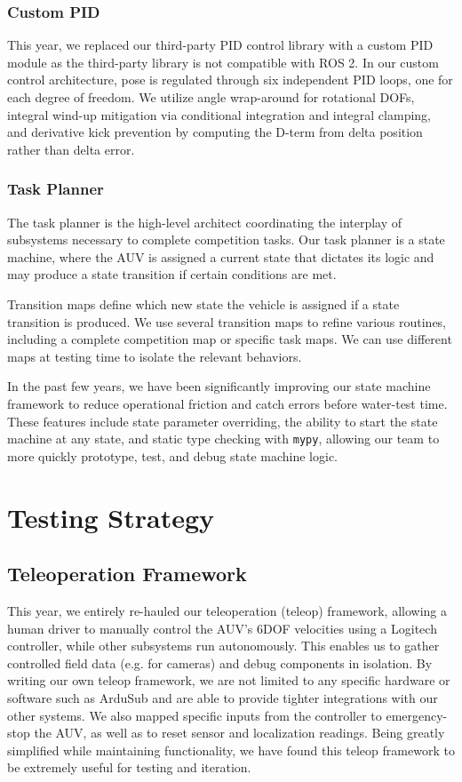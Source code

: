 \documentclass[conference]{IEEEtran}
\begin{document}
\subsubsection{Custom PID}
\label{sssec:custom_pid}
This year, we replaced our third-party PID control library with a custom PID module as the third-party library is not compatible with ROS 2. In our custom control architecture, pose is regulated through six independent PID loops, one for each degree of freedom. We utilize angle wrap-around for rotational DOFs, integral wind-up mitigation via conditional integration and integral clamping, and derivative kick prevention by computing the D-term from delta position rather than delta error.

\subsubsection{Task Planner}
\label{sssec:task_planner}
The task planner is the high-level architect coordinating the interplay of subsystems necessary to complete competition tasks. Our task planner is a state machine, where the AUV is assigned a current state that dictates its logic and may produce a state transition if certain conditions are met.

Transition maps define which new state the vehicle is assigned if a state transition is produced. We use several transition maps to refine various routines, including a complete competition map or specific task maps. We can use different maps at testing time to isolate the relevant behaviors.

In the past few years, we have been significantly improving our state machine framework to reduce operational friction and catch errors before water-test time. These features include state parameter overriding, the ability to start the state machine at any state, and static type checking with \verb|mypy|, allowing our team to more quickly prototype, test, and debug state machine logic. 

\section{Testing Strategy}
\label{sec:testing}

\subsection{Teleoperation Framework}
\label{ssec:teleop}
This year, we entirely re-hauled our teleoperation (teleop) framework, allowing a human driver to manually control the AUV's 6DOF velocities using a Logitech controller, while other subsystems run autonomously. This enables us to gather controlled field data (e.g. for cameras) and debug components in isolation. By writing our own teleop framework, we are not limited to any specific hardware or software such as ArduSub and are able to provide tighter integrations with our other systems. We also mapped specific inputs from the controller to emergency-stop the AUV, as well as to reset sensor and localization readings. Being greatly simplified while maintaining functionality, we have found this teleop framework to be extremely useful for testing and iteration.
\end{document}
